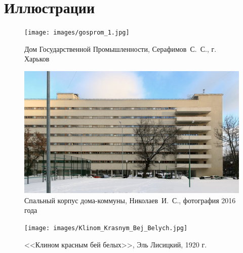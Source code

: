 \clearpage
{}
\listoffigures
\clearpage
\chapter*{Иллюстрации}
\begin{figure}[ht]
    \centering
    \texttt{[image: images/gosprom\_1.jpg]}
    \caption{Дом Государственной Промышленности, Серафимов~С.~С., г. Харьков}\label{fig:gosprom}
\end{figure}
\clearpage

\begin{figure}[ht]
    \centering
    \includegraphics[width=\textwidth]{images/Moscow_Ordzhonikidze8_Y18.jpg}
    \caption{Спальный корпус дома-коммуны, Николаев~И.~С., фотография 2016 года}
    \label{fig:communa}
\end{figure}
\clearpage

\begin{figure}[ht]
    \centering
    \texttt{[image: images/Klinom\_Krasnym\_Bej\_Belych.jpg]}
    \caption{<<Клином красным бей белых>>, Эль Лисицкий, 1920 г.}
    \label{fig:klin}
\end{figure}
\clearpage